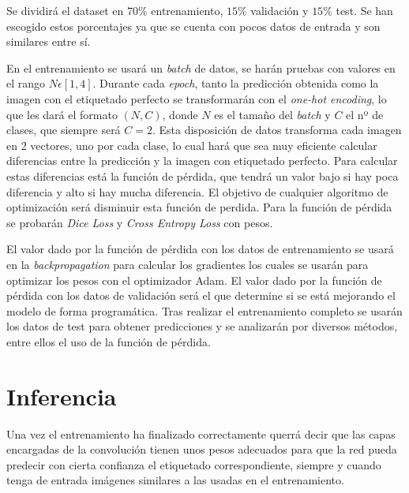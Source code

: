 Se dividirá el dataset en $ 70\% $ entrenamiento, $ 15\% $ validación y $ 15\% $ test. Se han escogido estos porcentajes ya que se cuenta con pocos datos de entrada y son similares entre sí.

En el entrenamiento se usará un \textit{batch} de datos, se harán pruebas con valores en el rango $N\epsilon[1,4]$. Durante cada \textit{epoch}, tanto la predicción obtenida como la imagen con el etiquetado perfecto se transformarán con el \textit{one-hot encoding}, lo que les dará el formato $(N, C)$, donde $N$ es el tamaño del \textit{batch} y $C$ el nº de clases, que siempre será $C=2$. Esta disposición de datos transforma cada imagen en 2 vectores, uno por cada clase, lo cual hará que sea muy eficiente calcular diferencias entre la predicción y la imagen con etiquetado perfecto. Para calcular estas diferencias está la función de pérdida, que tendrá un valor bajo si hay poca diferencia y alto si hay mucha diferencia. El objetivo de cualquier algoritmo de optimización será disminuir esta función de perdida. Para la función de pérdida se probarán \textit{Dice Loss} y \textit{Cross Entropy Loss} con pesos.

El valor dado por la función de pérdida con los datos de entrenamiento se usará en la \textit{backpropagation} para calcular los gradientes los cuales se usarán para optimizar los pesos con el optimizador Adam. El valor dado por la función de pérdida con los datos de validación será el que determine si se está mejorando el modelo de forma programática. Tras realizar el entrenamiento completo  se usarán los datos de test para obtener predicciones y se analizarán por diversos métodos, entre ellos el uso de la función de pérdida.

\pagebreak \section{Inferencia}\label{sec:inferencia}


Una vez el entrenamiento ha finalizado correctamente querrá decir que las capas encargadas de la convolución tienen unos pesos adecuados para que la red pueda predecir con cierta confianza el etiquetado correspondiente, siempre y cuando tenga de entrada imágenes similares a las usadas en el entrenamiento.

